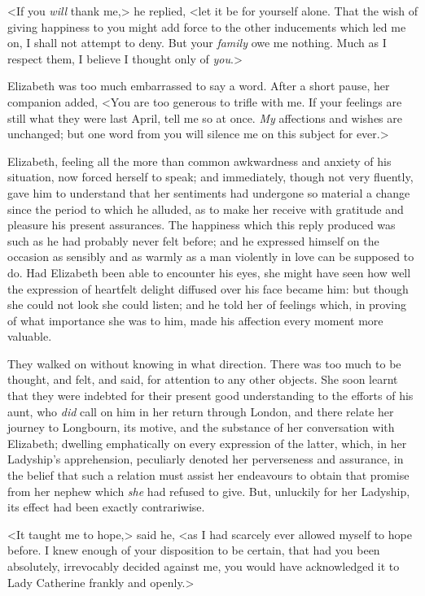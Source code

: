 <If you \textit{will} thank me,> he replied, <let it be for yourself alone. That the wish of giving happiness to you might add force to the other inducements which led me on, I shall not attempt to deny. But your \textit{family} owe me nothing. Much as I respect them, I believe I thought only of \textit{you}.>

Elizabeth was too much embarrassed to say a word. After a short pause, her companion added, <You are too generous to trifle with me. If your feelings are still what they were last April, tell me so at once. \textit{My} affections and wishes are unchanged; but one word from you will silence me on this subject for ever.>

Elizabeth, feeling all the more than common awkwardness and anxiety of his situation, now forced herself to speak; and immediately, though not very fluently, gave him to understand that her sentiments had undergone so material a change since the period to which he alluded, as to make her receive with gratitude and pleasure his present assurances. The happiness which this reply produced was such as he had probably never felt before; and he expressed himself on the occasion as sensibly and as warmly as a man violently in love can be supposed to do. Had Elizabeth been able to encounter his eyes, she might have seen how well the expression of heartfelt delight diffused over his face became him: but though she could not look she could listen; and he told her of feelings which, in proving of what importance she was to him, made his affection every moment more valuable.

They walked on without knowing in what direction. There was too much to be thought, and felt, and said, for attention to any other objects. She soon learnt that they were indebted for their present good understanding to the efforts of his aunt, who \textit{did} call on him in her return through London, and there relate her journey to Longbourn, its motive, and the substance of her conversation with Elizabeth; dwelling emphatically on every expression of the latter, which, in her Ladyship's apprehension, peculiarly denoted her perverseness and assurance, in the belief that such a relation must assist her endeavours to obtain that promise from her nephew which \textit{she} had refused to give. But, unluckily for her Ladyship, its effect had been exactly contrariwise.

<It taught me to hope,> said he, <as I had scarcely ever allowed myself to hope before. I knew enough of your disposition to be certain, that had you been absolutely, irrevocably decided against me, you would have acknowledged it to Lady Catherine frankly and openly.>

